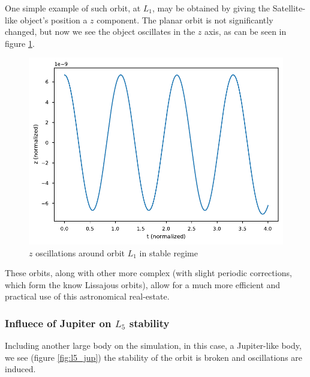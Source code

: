\documentclass{aa}
\begin{document}
One simple example of such orbit, at $L_1$, may be obtained by giving the
Satellite-like object's position a $z$ component. The planar orbit is not
significantly changed, but now we see the object oscillates in the $z$ axis, as
can be seen in figure \ref{fig:l5_z}.

\begin{figure}
  \centering
  \includegraphics[width=\linewidth]{figs/l5_z.pdf}
  \caption{$z$ oscillations around orbit $L_1$ in stable regime}
  \label{fig:l5_z}
\end{figure}

These orbits, along with other more complex (with slight periodic corrections,
which form the know Lissajous orbits), allow for a much more efficient and
practical use of this astronomical real-estate.

\subsubsection{Influece of Jupiter on $L_5$ stability}

Including another large body on the simulation, in this case, a Jupiter-like
body, we see (figure \ref{fig:l5_jup}) the stability of the orbit is broken and
oscillations are induced.
\end{document}
